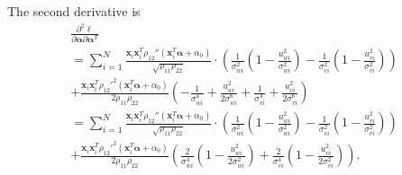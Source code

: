 \documentclass[aap,authoryear, preprint]{imsart}
\numberwithin{equation}{section}
\theoremstyle{plain}
\begin{document}
\noindent The second derivative is
\begin{equation}
    \begin{multlined}
    \frac{\partial^2 \ell}{\partial \bm{\alpha} \partial \bm{\alpha}^T}\\
    = \sum_{i=1}^{N} \frac{\bm{x}_i \bm{x}_i^T \rho_{12}''(\bm{x}_i^T\bm{\alpha}+\alpha_0)}{\sqrt{\rho_{11}\rho_{22}}} \cdot
    \left(
    \frac{1}{\sigma_{wi}^2} \left( 1 - \frac{u_{wi}^2}{\sigma_{wi}^2}\right) - 
    \frac{1}{\sigma_{vi}^2} \left( 1 - \frac{u_{vi}^2}{\sigma_{vi}^2} \right)
    \right)\\
    + \frac{\bm{x}_i \bm{x}_i^T {\rho_{12}'}^2(\bm{x}_i^T\bm{\alpha} + \alpha_0)}{2\rho_{11}\rho_{22}}
    \left(
    -\frac{1}{\sigma_{wi}^4} + \frac{u_{wi}^2}{2\sigma_{wi}^6} + 
    \frac{1}{\sigma_{vi}^4} + \frac{u_{vi}^2}{2\sigma_{vi}^6}
    \right)\\
    = \sum_{i=1}^{N} \frac{\bm{x}_i \bm{x}_i^T \rho_{12}''(\bm{x}_i^T\bm{\alpha}+\alpha_0)}{\sqrt{\rho_{11}\rho_{22}}} \cdot
    \left(
    \frac{1}{\sigma_{wi}^2} \left( 1 - \frac{u_{wi}^2}{\sigma_{wi}^2}\right) - 
    \frac{1}{\sigma_{vi}^2} \left( 1 - \frac{u_{vi}^2}{\sigma_{vi}^2} \right)
    \right)\\
    + \frac{\bm{x}_i \bm{x}_i^T {\rho_{12}'}^2(\bm{x}_i^T\bm{\alpha}+\alpha_0)}{2\rho_{11}\rho_{22}}
    \left(
    \frac{2}{\sigma_{wi}^4} \left(1-\frac{u_{wi}^2}{2\sigma_{wi}^2}\right)+
    \frac{2}{\sigma_{vi}^4} \left(1-\frac{u_{vi}^2}{2\sigma_{vi}^2}\right)
    \right).
    \end{multlined}
\end{equation}
\end{document}
